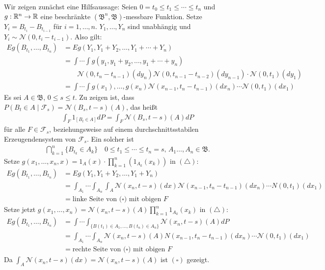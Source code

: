 \documentclass[a4paper,twoside,DIV15,BCOR12mm]{scrbook}
\newcommand{\cF}{\mathcal F}
\newcommand{\borel}{{\mathfrak B}}
\begin{document}
\begin{beweis}
Wir zeigen zunächst eine Hilfsaussage: Seien $0=t_0\le t_1\le \cdots \le t_n$ und $g:\mathbb{R}^n\to \mathbb{R}$ eine beschränkte $(\borel^n,\borel)$-messbare Funktion. Setze $Y_i=B_{t_i}-B_{t_{i-1}}$ für $i=1,\ldots,n$. $Y_1,\ldots,Y_n$ sind unabhängig und $Y_i\sim\mathcal N(0,t_i-t_{i-1})$. Also gilt:
\begin{align*}
Eg(B_{t_1},\ldots,B_{t_n}) &= Eg(Y_1,Y_1+Y_2,\ldots,Y_1+\cdots +Y_n) \tag{$\triangle$}\\
&= 
\int\cdots\int g(y_1,y_1+y_2,\ldots,y_1+\cdots +y_n) \\
&\quad\quad 
\mathcal N(0,t_n-t_{n-1})(dy_n) \mathcal N(0,t_{n-1}-t_{n-2})(dy_{n-1})\cdot \mathcal N(0,t_1)(dy_1)\\
&= \int\cdots\int g(x_1),\ldots,g(x_n) \mathcal N(x_{n-1},t_n-t_{n-1})(dx_n) \cdots \mathcal N(0,t_1)(dx_1)
\end{align*}
Es sei $A\in \borel$, $0\le s\le t$. Zu zeigen ist, dass $P(B_t\in A\mid \cF_s) = \mathcal N(B_s,t-s)(A)$, das heißt
\begin{align*}
\int_F 1_{[B_t\in A]} dP = \int_F\mathcal N(B_s,t-s)(A)dP \tag{$\square$}
\end{align*}
für alle $F\in \cF_s$, beziehungsweise auf einem durchschnittsstabilen Erzeugendensystem von $\cF_s$. Ein solcher ist
\begin{align*}
\bigcap_{k=1}^n \{B_{t_k}\in A_k\}\quad 0\le t_1\le \cdots\le t_n=s,\, A_1\ldots,A_n\in \borel.
\end{align*}
Setze $g(x_1,\ldots,x_n,x)= 1_A(x)\cdot \prod_{k=1}^n(1_{A_k}(x_k))$ in $(\triangle)$:
\begin{align*}
Eg(B_{t_1},\ldots,B_{t_n}) &= Eg(Y_1,Y_1+Y_2,\ldots,Y_1+Y_n) \\
&=\int_{A_1}\cdots\int_{A_n}\int_A \mathcal N(x_n,t-s)(dx)\mathcal N(x_{n-1},t_n-t_{n-1})(dx_n)\cdots N(0,t_1)(dx_1) \\
&= \text{linke Seite von ($\square$) mit obigen $F$}
\end{align*}
Setze jetzt $g(x_1,\ldots,x_n) = \mathcal N(x_n,t-s)(A)\prod_{k=1}^n 1_{A_k}(x_k)$ in $(\triangle)$:
\begin{align*}
Eg(B_{t_1},\ldots,B_{t_n}) &= \int\cdots\int_{\{B(t_1)\in A_1,\ldots,B(t_n)\in A_n\}} \mathcal N(x_n,t-s)(A) dP\\
&= \int_{A_1}\cdots\int_{A_n} \mathcal N (x_n,t-s)(A) N(x_{n-1},t_n-t_{n-1})(dx_n) \cdots \mathcal N(0,t_1)(dx_1)\\
&= \text{rechte Seite von ($\square$) mit obigen $F$}
\end{align*}
Da $\int_A\mathcal N(x_n,t-s)(dx) = \mathcal N(x_n,t-s)(A)$ ist $(\square)$ gezeigt.
\end{beweis}
\end{document}

